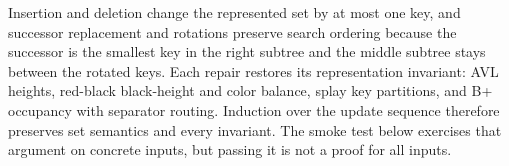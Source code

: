 Insertion and deletion change the represented set by at most one key, and successor replacement and rotations preserve search ordering because the successor is the smallest key in the right subtree and the middle subtree stays between the rotated keys. Each repair restores its representation invariant: AVL heights, red-black black-height and color balance, splay key partitions, and B+ occupancy with separator routing. Induction over the update sequence therefore preserves set semantics and every invariant. The smoke test below exercises that argument on concrete inputs, but passing it is not a proof for all inputs.
